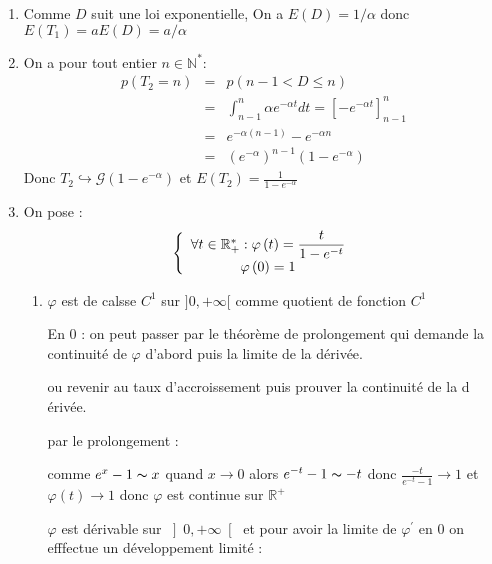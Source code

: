 \documentclass[a4paper, 11pt,reqno]{article}
\begin{document}
\begin{enumerate}
\item Comme $D$ suit une loi exponentielle, On a $E\left( D\right) =1/\alpha 
$ donc $E(T_{1})=aE\left( D\right) =a/\alpha $

\item On a pour tout entier $n\in \mathbb{N}^{*}:$%
\begin{eqnarray*}
p\left( T_{2}=n\right) &=&p\left( n-1<D\le n\right) \\
&=&\int_{n-1}^{n}\alpha e^{-\alpha t}dt=\left[ -e^{-\alpha t}\right]
_{n-1}^{n} \\
&=&e^{-\alpha \left( n-1\right) }-e^{-\alpha n} \\
&=&\left( e^{-\alpha }\right) ^{n-1}\left( 1-e^{-\alpha }\right)
\end{eqnarray*}
Donc $T_{2}\hookrightarrow \mathcal{G}\left( 1-e^{-\alpha }\right) $ et $%
E(T_{2})=\displaystyle
\frac{1}{1-e^{-\alpha }}$

\item On pose : 
\begin{equation*}
\left\{ 
\begin{array}{c}
\forall t\in \mathbb{R}_{+}^{*}:\displaystyle \varphi \left( t\right) =\frac{%
t}{1-e^{-t}} \\ 
\varphi \left( 0\right) =1%
\end{array}
\right.
\end{equation*}

\begin{enumerate}
\item $\varphi $ est de calsse $C^{1}$ sur $]0,+\infty [$ comme quotient de
fonction $C^{1}$

En $0$ : on peut passer par le th\'{e}or\`{e}me de prolongement qui demande
la continuit\'{e} de $\varphi $ d'abord puis la limite de la d\'{e}riv\'{e}e.

ou revenir au taux d'accroissement puis prouver la continuit\'{e} de la d%
\'{e}riv\'{e}e.

par le prolongement :

comme $e^{x}-1\thicksim x$ quand $x\rightarrow 0$ alors $e^{-t}-1\thicksim
-t $ donc $\displaystyle
\frac{-t}{e^{-t}-1}\rightarrow 1$ et $\varphi \left( t\right) \rightarrow 1$
donc $\varphi $ est continue sur $\mathbb{R}^{+}$

$\varphi $ est d\'{e}rivable sur $\left] 0,+\infty \right[ $ et pour avoir
la limite de $\varphi ^{\prime }$ en $0$ on efffectue un d\'{e}veloppement
limit\'{e} :


\end{enumerate}
\end{enumerate}
\end{document}
